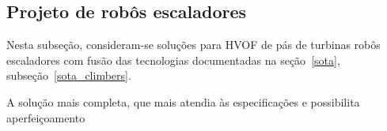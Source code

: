 \subsection{Projeto de robôs escaladores}\label{proj_climbers}
Nesta subseção, consideram-se soluções para HVOF de pás de turbinas robôs
escaladores com fusão das tecnologias documentadas na
seção~\ref{sota}, subseção~\ref{sota_climbers}.

A solução mais completa, que mais atendia às especificações e possibilita
aperfeiçoamento 
